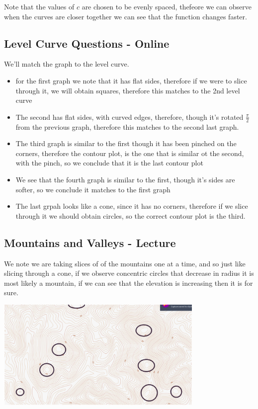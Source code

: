 \documentclass[11pt]{book}
\begin{document}
Note that the values of $c$ are chosen to be evenly spaced, thefeore we can observe when the curves are closer together we can see that the function changes faster.

\subsection{Level Curve Questions - Online}%
\label{sub:level_curve_questions_online}
We'll match the graph to the level curve.
\begin{itemize}
    \item for the first graph we note that it has flat sides, therefore if we were to slice through it, we will obtain squares, therefore this matches to the 2nd level curve
    \item The second has flat sides, with curved edges, therefore, though it's rotated $\frac{\pi}{2} $ from the previous graph, therefore this matches to the second last graph.
    \item The third graph is similar to the first though it has been pinched on the corners, therefore the contour plot, is the one that is similar ot the second, with the pinch, so we conclude that it is the last contour plot
    \item We see that the fourth graph is similar to the first, though it's sides are softer, so we conclude it matches to the first graph
    \item The last grpah looks like a cone, since it has no corners, therefore if we slice through it we should obtain circles, so the correct contour plot is the third.
\end{itemize}

\newpage

\subsection{Mountains and Valleys - Lecture}%
\label{sub:mountains_and_valleys_lecture}

We note we are taking slices of of the mountains one at a time, and so just like slicing through a cone, if we observe concentric circles that decrease in radius it is most likely a mountain, if we can see that the elevation is increasing then it is for sure.

\begin{center}
    \includegraphics[width=100mm]{assets/lec2_mount.png} 
\end{center}
\end{document}
